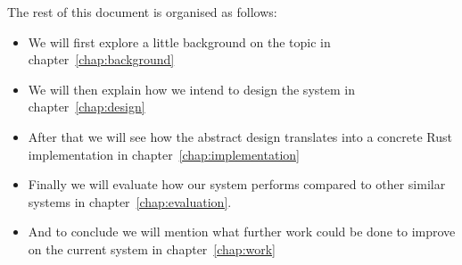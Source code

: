 The rest of this document is organised as follows: %
\begin{itemize}
\item We will first explore a little background on the topic in
  chapter~\ref{chap:background}
\item We will then explain how we intend to design the system in
  chapter~\ref{chap:design}
\item After that we will see how the abstract design translates into a
  concrete Rust implementation in chapter~\ref{chap:implementation}
\item Finally we will evaluate how our system performs compared to
  other similar systems in chapter~\ref{chap:evaluation}.
\item And to conclude we will mention what further work could be done
  to improve on the current system in chapter~\ref{chap:work}
\end{itemize}
